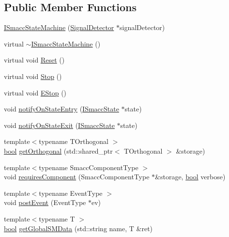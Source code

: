 \subsection*{Public Member Functions}
\begin{DoxyCompactItemize}
\item 
\hyperlink{classsmacc_1_1ISmaccStateMachine_a497c2185584adbec3298d4000277b75e}{I\+Smacc\+State\+Machine} (\hyperlink{classsmacc_1_1SignalDetector}{Signal\+Detector} $\ast$signal\+Detector)
\item 
virtual \hyperlink{classsmacc_1_1ISmaccStateMachine_a54bb9bac0008d3efc6a50cce88dce48e}{$\sim$\+I\+Smacc\+State\+Machine} ()
\item 
virtual void \hyperlink{classsmacc_1_1ISmaccStateMachine_a73d50cda0e1bee05812186bf57d6190e}{Reset} ()
\item 
virtual void \hyperlink{classsmacc_1_1ISmaccStateMachine_a45032346275dcc8e23abece4d524ca3c}{Stop} ()
\item 
virtual void \hyperlink{classsmacc_1_1ISmaccStateMachine_af79fbc17f064bba77e598f5e55a86200}{E\+Stop} ()
\item 
void \hyperlink{classsmacc_1_1ISmaccStateMachine_aab812187ecb452771e91f0003b257cd2}{notify\+On\+State\+Entry} (\hyperlink{classsmacc_1_1ISmaccState}{I\+Smacc\+State} $\ast$state)
\item 
void \hyperlink{classsmacc_1_1ISmaccStateMachine_a9c499f2e3df95a9f72731d2d0d1de0e6}{notify\+On\+State\+Exit} (\hyperlink{classsmacc_1_1ISmaccState}{I\+Smacc\+State} $\ast$state)
\item 
{\footnotesize template$<$typename T\+Orthogonal $>$ }\\\hyperlink{classbool}{bool} \hyperlink{classsmacc_1_1ISmaccStateMachine_a66a6732a48dbc0bc7a95b57fba5ec980}{get\+Orthogonal} (std\+::shared\+\_\+ptr$<$ T\+Orthogonal $>$ \&storage)
\item 
{\footnotesize template$<$typename Smacc\+Component\+Type $>$ }\\void \hyperlink{classsmacc_1_1ISmaccStateMachine_a729d0bcb3c4894e33f0696e0b1aeb155}{requires\+Component} (Smacc\+Component\+Type $\ast$\&storage, \hyperlink{classbool}{bool} verbose)
\item 
{\footnotesize template$<$typename Event\+Type $>$ }\\void \hyperlink{classsmacc_1_1ISmaccStateMachine_ad80cdd7bbc9a9f3b221c625754fed1ed}{post\+Event} (Event\+Type $\ast$ev)
\item 
{\footnotesize template$<$typename T $>$ }\\\hyperlink{classbool}{bool} \hyperlink{classsmacc_1_1ISmaccStateMachine_aeda2d6813c6c428bf318a5792e014b61}{get\+Global\+S\+M\+Data} (std\+::string name, T \&ret)

\end{DoxyCompactItemize}
